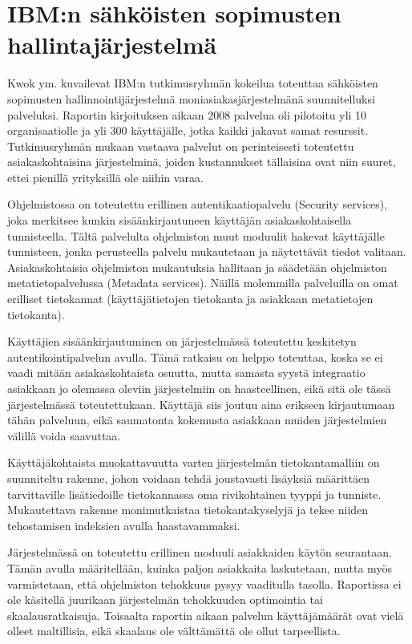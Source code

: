 \section{IBM:n sähköisten sopimusten hallintajärjestelmä}
Kwok ym. \cite{kwok2008software} kuvailevat IBM:n tutkimusryhmän kokeilua toteuttaa sähköisten sopimusten hallinnointijärjestelmä moniasiakasjärjestelmänä suunnitelluksi palveluksi. Raportin kirjoituksen aikaan 2008 palvelua oli pilotoitu yli 10 organisaatiolle ja yli 300 käyttäjälle, jotka kaikki jakavat samat resurssit. Tutkimusryhmän mukaan vastaava palvelut on perinteisesti toteutettu asiakaskohtaisina järjestelminä, joiden kustannukset tällaisina ovat niin suuret, ettei pienillä yrityksillä ole niihin varaa.

Ohjelmistossa on toteutettu erillinen autentikaatiopalvelu (Security services), joka merkitsee kunkin sisäänkirjautuneen käyttäjän asiakaskohtaisella tunnisteella. Tältä palvelulta ohjelmiston muut moduulit hakevat käyttäjälle tunnisteen, jonka perusteella palvelu mukautetaan ja näytettävät tiedot valitaan. Asiakaskohtaisia ohjelmiston mukautuksia hallitaan ja säädetään ohjelmiston metatietopalvelussa (Metadata services). Näillä molemmilla palveluilla on omat erilliset tietokannat (käyttäjätietojen tietokanta ja asiakkaan metatietojen tietokanta).

Käyttäjien sisäänkirjautuminen on järjestelmässä toteutettu keskitetyn autentikointipalvelun avulla. Tämä ratkaisu on helppo toteuttaa, koska se ei vaadi mitään asiakaskohtaista osuutta, mutta samasta syystä integraatio asiakkaan jo olemassa oleviin järjestelmiin on haasteellinen, eikä sitä ole tässä järjestelmässä toteutettukaan. Käyttäjä siis joutuu aina erikseen kirjautumaan tähän palveluun, eikä saumatonta kokemusta asiakkaan muiden järjestelmien välillä voida saavuttaa.

Käyttäjäkohtaista muokattavuutta varten järjestelmän tietokantamalliin on suunniteltu rakenne, johon voidaan tehdä joustavasti lisäyksiä määrittäen tarvittaville lisätiedoille tietokannassa oma rivikohtainen tyyppi ja tunniste. Mukautettava rakenne monimutkaistaa tietokantakyselyjä ja tekee niiden tehostamisen indeksien avulla haastavammaksi.

Järjestelmässä on toteutettu erillinen moduuli asiakkaiden käytön seurantaan. Tämän avulla määritellään, kuinka paljon asiakkaita laskutetaan, mutta myös varmistetaan, että ohjelmiston tehokkuus pysyy vaaditulla tasolla. Raportissa ei ole käsitellä juurikaan järjestelmän tehokkuuden optimointia tai skaalausratkaisuja. Toisaalta raportin aikaan palvelun käyttäjämäärät ovat vielä olleet maltillisia, eikä skaalaus ole välttämättä ole ollut tarpeellista.

